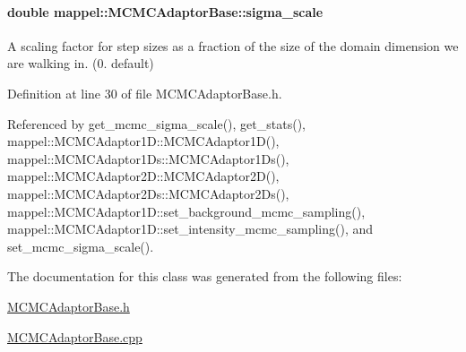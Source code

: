 \paragraph[{\texorpdfstring{sigma\+\_\+scale}{sigma_scale}}]{\setlength{\rightskip}{0pt plus 5cm}double mappel\+::\+M\+C\+M\+C\+Adaptor\+Base\+::sigma\+\_\+scale\hspace{0.3cm}{\ttfamily [protected]}}\hypertarget{classmappel_1_1MCMCAdaptorBase_a76312f7d589bf3f3e754beca174b884b}{}\label{classmappel_1_1MCMCAdaptorBase_a76312f7d589bf3f3e754beca174b884b}
A scaling factor for step sizes as a fraction of the size of the domain dimension we are walking in. (0. default) 

Definition at line 30 of file M\+C\+M\+C\+Adaptor\+Base.\+h.



Referenced by get\+\_\+mcmc\+\_\+sigma\+\_\+scale(), get\+\_\+stats(), mappel\+::\+M\+C\+M\+C\+Adaptor1\+D\+::\+M\+C\+M\+C\+Adaptor1\+D(), mappel\+::\+M\+C\+M\+C\+Adaptor1\+Ds\+::\+M\+C\+M\+C\+Adaptor1\+Ds(), mappel\+::\+M\+C\+M\+C\+Adaptor2\+D\+::\+M\+C\+M\+C\+Adaptor2\+D(), mappel\+::\+M\+C\+M\+C\+Adaptor2\+Ds\+::\+M\+C\+M\+C\+Adaptor2\+Ds(), mappel\+::\+M\+C\+M\+C\+Adaptor1\+D\+::set\+\_\+background\+\_\+mcmc\+\_\+sampling(), mappel\+::\+M\+C\+M\+C\+Adaptor1\+D\+::set\+\_\+intensity\+\_\+mcmc\+\_\+sampling(), and set\+\_\+mcmc\+\_\+sigma\+\_\+scale().



The documentation for this class was generated from the following files\+:\begin{DoxyCompactItemize}
\item 
\hyperlink{MCMCAdaptorBase_8h}{M\+C\+M\+C\+Adaptor\+Base.\+h}\item 
\hyperlink{MCMCAdaptorBase_8cpp}{M\+C\+M\+C\+Adaptor\+Base.\+cpp}\end{DoxyCompactItemize}
